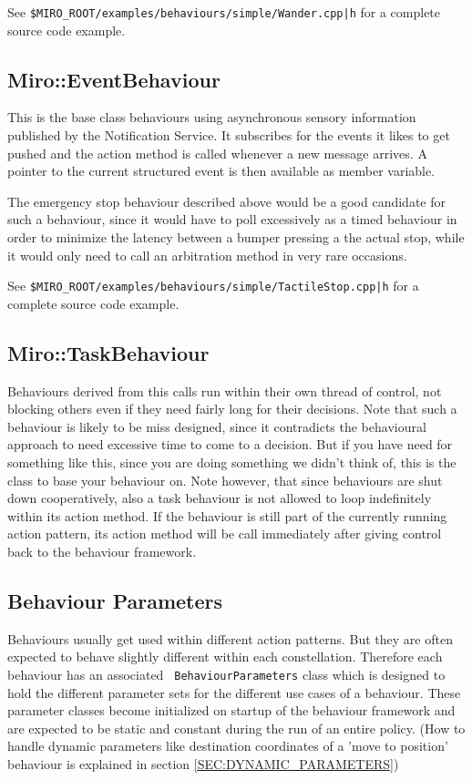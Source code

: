 See {\tt \$MIRO\_ROOT/examples/behaviours/simple/Wander.cpp|h} for a
complete source code example.

\subsection{Miro::EventBehaviour}
\label{SEC:MIRO_EVENT_BEHAVIOUR}

This is the base class behaviours using asynchronous sensory
information published by the Notification Service. It subscribes for
the events it likes to get pushed and the action method is called
whenever a new message arrives. A pointer to the current structured
event is then available as member variable.

The emergency stop behaviour described
above would be a good candidate for such a behaviour, since it would
have to poll excessively as a timed behaviour in order to minimize the
latency between a bumper pressing a the actual stop, while it would
only need to call an arbitration method in very rare occasions.

See {\tt \$MIRO\_ROOT/examples/behaviours/simple/TactileStop.cpp|h} for a
complete source code example.

\subsection{Miro::TaskBehaviour}
\label{SEC:MIRO_TASK_BEHAVIOUR}

Behaviours derived from this calls run within their own thread of
control, not blocking others even if they need fairly long for their
decisions. Note that such a behaviour is likely to be miss designed,
since it contradicts the behavioural approach to need excessive time
to come to a decision. But if you have need for something like this,
since you are doing something we didn't think of, this is the class to
base your behaviour on. Note however, that since behaviours are shut
down cooperatively, also a task behaviour is not allowed to loop
indefinitely within its action method. If the behaviour is still part
of the currently running action pattern, its action method will be
call immediately after giving control back to the behaviour framework.

\subsection{Behaviour Parameters}

Behaviours usually get used within different action patterns. But they
are often expected to behave slightly different within each
constellation. Therefore each behaviour has an associated {\tt
  BehaviourParameters} class which is designed to hold the different
parameter sets for the different use cases of a behaviour. These
parameter classes become initialized on startup of the behaviour
framework and are expected to be static and constant during the run of
an entire policy. (How to handle dynamic parameters like destination
coordinates of a 'move to position' behaviour is explained in section
\ref{SEC:DYNAMIC_PARAMETERS})


